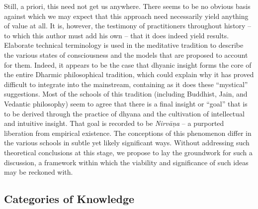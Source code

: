 \documentclass[pra,twocolumn,groupedaddress,10pt]{revtex4}
\theoremstyle{definition}
\begin{document}
Still, a priori, this need not get us anywhere. There seems to be no obvious basis against which we may expect that this approach need necessarily yield anything of value at all. It is, however, the testimony of practitioners throughout history -- to which this author must add his own -- that it does indeed yield results. Elaborate technical terminology is used in the meditative tradition to describe the various states of consciousness and the models that are proposed to account for them. Indeed, it appears to be the case that dhyanic insight forms the core of the entire Dharmic philosophical tradition, which could explain why it has proved difficult to integrate into the mainstream, containing as it does these ``mystical'' suggestions. Most of the schools of this tradition (including Buddhist, Jain, and Vedantic philosophy) seem to agree that there is a final insight or ``goal'' that is to be derived through the practice of dhyana and the cultivation of intellectual and intuitive insight. That goal is recorded to be \emph{Nirv\={a}\d{n}a} -- a purported liberation from empirical existence. The conceptions of this phenomenon differ in the various schools in subtle yet likely significant ways. Without addressing such theoretical conclusions at this stage, we propose to lay the groundwork for such a discussion, a framework within which the viability and significance of such ideas may be reckoned with.

\subsection{Categories of Knowledge} \label{sec:catkno}
\end{document}
